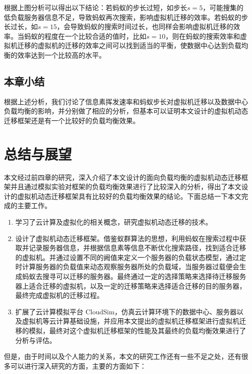 根据上图分析可以得出以下结论：若蚂蚁的步长过短，如步长$ s = 5$，可能搜集的低负载服务器信息不足，导致蚂蚁再次搜索，影响虚拟机迁移的效率。若蚂蚁的步长过长，如$ s = 15 $，会导致蚂蚁的搜索时间过长，也同样会影响虚拟机迁移的效率。当蚂蚁的程度在一个比较合适的值时，比如$ s = 10 $，则在蚂蚁的搜索效率和虚拟机迁移的虚拟机的迁移的效率之间可以找到适当的平衡，使数据中心达到负载均衡的效率达到一个比较高的水平。

 \section{本章小结}
根据上述分析，我们讨论了信息素挥发速率和蚂蚁步长对虚拟机迁移以及数据中心负载均衡的影响，并分别做了相应的分析，但基本可以证明本文设计的虚拟机动态迁移框架还是有一个比较好的负载均衡效果。

\chapter{总结与展望}
本文经过前四章的研究，深入介绍了本文设计的面向负载均衡的虚拟机动态迁移框架并且通过模拟实验对框架的负载均衡效果进行了比较深入的分析，得出了本文设计的虚拟机动态迁移框架具有比较好的负载均衡效果的结论。下面总结一下本文完成的主要工作。

\begin{enumerate}[(1)]
    \item 学习了云计算及虚拟化的相关概念，研究虚拟机动态迁移的技术。
    \item 设计了虚拟机动态迁移框架。借鉴蚁群算法的思想，利用蚂蚁在搜索过程中获取并记录服务器信息，并根据信息素等信息不断优化搜索路径，找到适合迁移的虚拟机。并通过设置不同的阙值来定义一个服务器的负载状态模型，通过定时计算服务器的负载值来动态观察服务器所处的负载域，当服务器过载便会生成蚂蚁去搜寻可以迁移的服务器。最终通过一定的选择策略来选择待迁移服务器上适合迁移的虚拟机，以及一定的迁移策略来选择适合迁移的目的服务器，最终完成虚拟机的迁移过程。
    \item 扩展了云计算模拟平台 CloudSim，仿真云计算环境下的数据中心、服务器以及虚拟机等云计算基础设施，并应用本文提出的虚拟机迁移框架进行虚拟机迁移的模拟，最终对这个虚拟机迁移框架的性能及其最终的负载均衡效果进行了分析与评估。
\end{enumerate}

但是，由于时间以及个人能力的关系，本文的研究工作还有一些不足之处，还有很多可以进行深入研究的方面，主要的方面如下：

